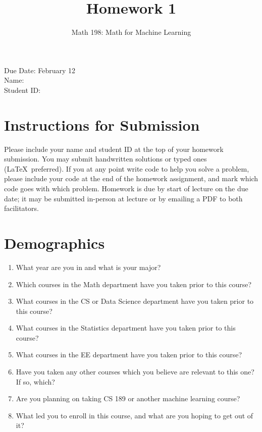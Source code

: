 \documentclass{article}
\title{Homework 1}
\author{Math 198: Math for Machine Learning}
\date{}
\begin{document}
\maketitle

\noindent
Due Date: February 12 \\
Name: \\
Student ID:

\section*{Instructions for Submission}
Please include your name and student ID at the top of your homework submission. You may submit handwritten solutions or typed ones (\LaTeX\ preferred). If you at any point write code to help you solve a problem, please include your code at the end of the homework assignment, and mark which code goes with which problem. Homework is due by start of lecture on the due date; it may be submitted in-person at lecture or by emailing a PDF to both facilitators.

\section{Demographics}
\begin{enumerate}[label=\arabic*.]
\item What year are you in and what is your major?
\item Which courses in the Math department have you taken prior to this course?
\item What courses in the CS or Data Science department have you taken prior to this course?
\item What courses in the Statistics department have you taken prior to this course?
\item What courses in the EE department have you taken prior to this course?
\item Have you taken any other courses which you believe are relevant to this one? If so, which?
\item Are you planning on taking CS 189 or another machine learning course?
\item What led you to enroll in this course, and what are you hoping to get out of it?
\end{enumerate}
\end{document}

